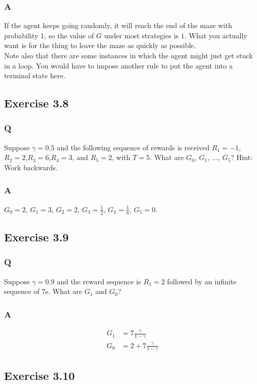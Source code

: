 \subsubsection{A}
If the agent keeps going randomly, it will reach the end of the maze with probability 1, so the value of $G$ under most strategies is $1$. What you actually want is for the thing to leave the maze as quickly as possible.\\

Note also that there are some instances in which the agent might just get stuck in a loop. You would have to impose another rule to put the agent into a terminal state here.

\subsection{Exercise 3.8}
\subsubsection{Q}
Suppose $\gamma = 0.5$ and the following sequence of rewards is received $R_1=-1$, $R_2 =2$,$R_3 =6$,$R_4 =3$, and $R_5 =2$, with $T =5$. What are $G_0$, $G_1$, $\dots$, $G_5$? Hint: Work backwards.

\subsubsection{A}
$G_0 = 2$, $G_1 = 3$, $G_2 = 2$, $G_3 = \frac12$, $G_4 = \frac18$, $G_5=0$.

\subsection{Exercise 3.9}
\subsubsection{Q}
Suppose $\gamma = 0.9$ and the reward sequence is $R_1 = 2$ followed by an infinite sequence of $7$s. What are $G_1$ and $G_0$?
\subsubsection{A}
\begin{align}
    G_1 &= 7 \frac{\gamma}{1 - \gamma} \\
    G_0 &= 2 + 7 \frac{\gamma}{1 - \gamma}
\end{align}


\subsection{Exercise 3.10}

